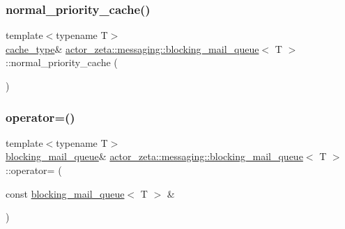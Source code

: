 \subsubsection{\texorpdfstring{normal\+\_\+priority\+\_\+cache()}{normal\_priority\_cache()}}
{\footnotesize\ttfamily template$<$typename T$>$ \\
\hyperlink{classactor__zeta_1_1messaging_1_1blocking__mail__queue_a20156eef06b0a688ceeb663097a90862}{cache\+\_\+type}\& \hyperlink{classactor__zeta_1_1messaging_1_1blocking__mail__queue}{actor\+\_\+zeta\+::messaging\+::blocking\+\_\+mail\+\_\+queue}$<$ T $>$\+::normal\+\_\+priority\+\_\+cache (\begin{DoxyParamCaption}{ }\end{DoxyParamCaption})\hspace{0.3cm}{\ttfamily [inline]}}

\mbox{\label{classactor__zeta_1_1messaging_1_1blocking__mail__queue_a595342b1b167fd4a889b6d3f2b533d7e}} 
\subsubsection{\texorpdfstring{operator=()}{operator=()}\hspace{0.1cm}{\footnotesize\ttfamily [1/2]}}
{\footnotesize\ttfamily template$<$typename T$>$ \\
\hyperlink{classactor__zeta_1_1messaging_1_1blocking__mail__queue}{blocking\+\_\+mail\+\_\+queue}\& \hyperlink{classactor__zeta_1_1messaging_1_1blocking__mail__queue}{actor\+\_\+zeta\+::messaging\+::blocking\+\_\+mail\+\_\+queue}$<$ T $>$\+::operator= (\begin{DoxyParamCaption}\item[{const \hyperlink{classactor__zeta_1_1messaging_1_1blocking__mail__queue}{blocking\+\_\+mail\+\_\+queue}$<$ T $>$ \&}]{ }\end{DoxyParamCaption})\hspace{0.3cm}{\ttfamily [delete]}}

\mbox{\label{classactor__zeta_1_1messaging_1_1blocking__mail__queue_ae5041536a45ba1a1fa68a1ac91c407d5}} 
